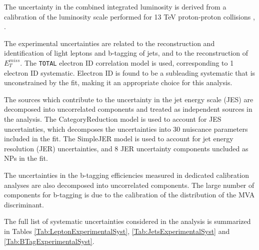 The uncertainty in the combined integrated luminosity is derived from a calibration of the luminosity scale performed for 13 TeV proton-proton collisions \cite{lumi}, \cite{LUCID2}.

The experimental uncertainties are related to the reconstruction and identification of light leptons and b-tagging of jets, and to the reconstruction of $E^{miss}_T$. The \verb!TOTAL! electron ID correlation model is used, corresponding to 1 electron ID systematic. Electron ID is found to be a subleading systematic that is unconstrained by the fit, making it an appropriate choice for this analysis.

The sources which contribute to the uncertainty in the jet energy scale (JES) \cite{jes} are decomposed into uncorrelated components and treated as independent sources in the analysis. The CategoryReduction model is used to account for JES uncertainties, which decomposes the uncertainties into 30 nuiscance parameters included in the fit. The SimpleJER model is used to account for jet energy resolution (JER) uncertainties, and 8 JER uncertainty components uncluded as NPs in the fit. 

The uncertainties in the b-tagging efficiencies measured in dedicated calibration analyses \cite{btag_cal} are also decomposed into uncorrelated components. The large number of components for b-tagging is due to the calibration of the distribution of the MVA discriminant.  


The full list of systematic uncertainties considered in the analysis is summarized in Tables
\ref{Tab:LeptonExperimentalSyst}, \ref{Tab:JetsExperimentalSyst} and \ref{Tab:BTagExperimentalSyst}.

